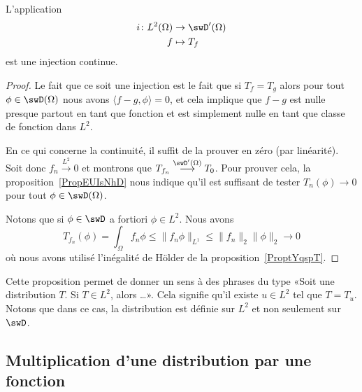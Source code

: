 \begin{proposition}\label{PROPooYAJSooMSwVOm}
    L'application
    \begin{equation}
        \begin{aligned}
            i\colon L^2(\Omega)&\to \swD'(\Omega) \\
            f&\mapsto T_f
        \end{aligned}
    \end{equation}
    est une injection continue.
\end{proposition}

\begin{proof}
    Le fait que ce soit une injection est le fait que si \( T_f=T_g\) alors pour tout \( \phi\in \swD(\Omega)\) nous avons \( \langle f-g, \phi\rangle =0\), et cela implique que \( f-g\) est nulle presque partout en tant que fonction et est simplement nulle en tant que classe de fonction dans \( L^2\).

    En ce qui concerne la continuité, il suffit de la prouver en zéro (par linéarité). Soit donc \( f_n\stackrel{L^2}{\longrightarrow}0\) et montrons que \( T_{f_n}\stackrel{\swD'(\Omega)}{\longrightarrow} T_0\). Pour prouver cela, la proposition~\ref{PropEUIsNhD} nous indique qu'il est suffisant de tester \( T_n(\phi)\to 0\) pour tout \( \phi\in\swD(\Omega)\).

    Notons que si \( \phi\in \swD\) a fortiori \( \phi\in L^2\). Nous avons
    \begin{equation}
        T_{f_n}(\phi)=\int_{\Omega}f_n\phi\leq \| f_n\phi \|_{L^1}\leq \| f_n \|_2\| \phi \|_2\to 0
    \end{equation}
    où nous avons utilisé l'inégalité de Hölder de la proposition~\ref{ProptYqspT}.
\end{proof}

Cette proposition permet de donner un sens à des phrases du type «Soit une distribution \( T\). Si \( T\in L^2\), alors \ldots». Cela signifie qu'il existe \( u\in L^2\) tel que \( T=T_u\). Notons que dans ce cas, la distribution est définie sur \( L^2\) et non seulement sur \( \swD\).

\subsection{Multiplication d'une distribution par une fonction}

